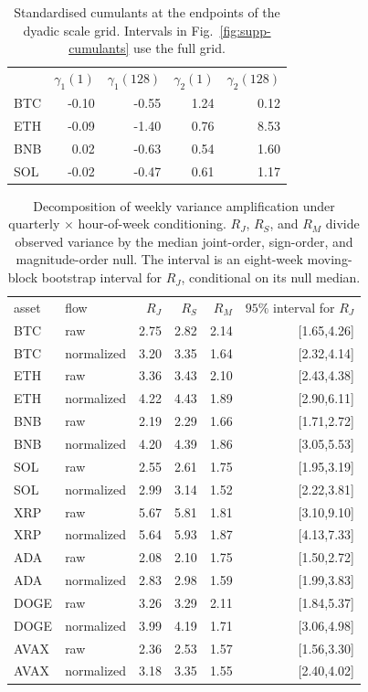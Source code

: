 \begin{table}[!htbp]
\caption{Standardised cumulants at the endpoints of the dyadic scale grid. Intervals in Fig.~\ref{fig:supp-cumulants} use the full grid.}
\label{tab:supp-cumulants}
\begin{ruledtabular}
\begin{tabular}{lrrrr}
 & $\gamma_1(1)$ & $\gamma_1(128)$ & $\gamma_2(1)$ & $\gamma_2(128)$ \\
\colrule
BTC & -0.10 & -0.55 & 1.24 & 0.12 \\
ETH & -0.09 & -1.40 & 0.76 & 8.53 \\
BNB & 0.02 & -0.63 & 0.54 & 1.60 \\
SOL & -0.02 & -0.47 & 0.61 & 1.17 \\
\end{tabular}
\end{ruledtabular}
\end{table}

\begin{table}[!htbp]
\caption{Decomposition of weekly variance amplification under quarterly $\times$ hour-of-week conditioning. $R_J$, $R_S$, and $R_M$ divide observed variance by the median joint-order, sign-order, and magnitude-order null. The interval is an eight-week moving-block bootstrap interval for $R_J$, conditional on its null median.}
\label{tab:supp-decomposition}
\begin{ruledtabular}
\begin{tabular}{llrrrr}
asset & flow & $R_J$ & $R_S$ & $R_M$ & $95\%$ interval for $R_J$ \\
\colrule
BTC & raw & 2.75 & 2.82 & 2.14 & [1.65,4.26] \\
BTC & normalized & 3.20 & 3.35 & 1.64 & [2.32,4.14] \\
ETH & raw & 3.36 & 3.43 & 2.10 & [2.43,4.38] \\
ETH & normalized & 4.22 & 4.43 & 1.89 & [2.90,6.11] \\
BNB & raw & 2.19 & 2.29 & 1.66 & [1.71,2.72] \\
BNB & normalized & 4.20 & 4.39 & 1.86 & [3.05,5.53] \\
SOL & raw & 2.55 & 2.61 & 1.75 & [1.95,3.19] \\
SOL & normalized & 2.99 & 3.14 & 1.52 & [2.22,3.81] \\
\colrule
XRP & raw & 5.67 & 5.81 & 1.81 & [3.10,9.10] \\
XRP & normalized & 5.64 & 5.93 & 1.87 & [4.13,7.33] \\
ADA & raw & 2.08 & 2.10 & 1.75 & [1.50,2.72] \\
ADA & normalized & 2.83 & 2.98 & 1.59 & [1.99,3.83] \\
DOGE & raw & 3.26 & 3.29 & 2.11 & [1.84,5.37] \\
DOGE & normalized & 3.99 & 4.19 & 1.71 & [3.06,4.98] \\
AVAX & raw & 2.36 & 2.53 & 1.57 & [1.56,3.30] \\
AVAX & normalized & 3.18 & 3.35 & 1.55 & [2.40,4.02] \\
\end{tabular}
\end{ruledtabular}
\end{table}

